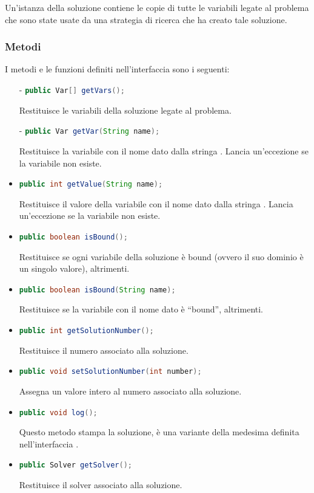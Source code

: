 Un'istanza della soluzione contiene le copie di tutte le variabili
legate al problema che sono state usate da una strategia di ricerca che ha
creato tale soluzione.

\subsubsection{Metodi}
I metodi e le funzioni definiti nell'interfaccia sono i seguenti:
\begin{itemize}
\item[-]\lstinline[language = Java]$public Var[] getVars();$

Restituisce le variabili della soluzione legate al problema.
\item[-]\lstinline[language = Java]$public Var getVar(String name);$

Restituisce la variabile con il nome dato dalla stringa . 
Lancia un'eccezione se la variabile non esiste.
\item[-]\lstinline[language = Java]$public int getValue(String name);$

Restituisce il valore della variabile con il nome dato dalla stringa 
. 
Lancia un'eccezione se la variabile non esiste.
\item[-]\lstinline[language = Java]$public boolean isBound();$

Restituisce  se ogni variabile della soluzione è bound (ovvero
il suo dominio è un singolo valore),  altrimenti.
\item[-]\lstinline[language = Java]$public boolean isBound(String name);$

Restituisce  se la variabile con il nome dato  è ``bound'',
 altrimenti.
\item[-]\lstinline[language = Java]$public int getSolutionNumber();$

Restituisce il numero associato alla soluzione.
\item[-]\lstinline[language = Java]$public void setSolutionNumber(int number);$

Assegna un valore intero al numero associato alla soluzione.
\item[-]\lstinline[language = Java]$public void log();$

Questo metodo stampa la soluzione, è una variante della medesima definita
nell'interfaccia .
\item[-]\lstinline[language = Java]$public Solver getSolver();$

Restituisce il solver associato alla soluzione.
\end{itemize}

